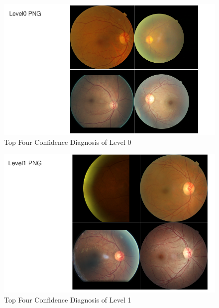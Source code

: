 \documentclass[letterpaper,12pt]{article}
\begin{document}
\begin{figure}[htbp]
\begin{center}
\includegraphics[scale=0.5]{images/Level0_Top4.png}
\caption{Top Four Confidence Diagnosis of Level 0}
\label{DR0}
\end{center}
\end{figure}

\begin{figure}[htbp]
\begin{center}
\includegraphics[scale=0.5]{images/Level1_Top4.png}
\caption{Top Four Confidence Diagnosis of Level 1}
\label{DR1}
\end{center}
\end{figure}
\end{document}
